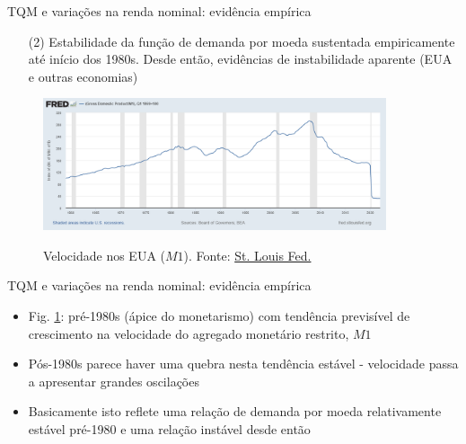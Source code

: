 \documentclass[10pt]{beamer}
\begin{document}
\begin{frame}{TQM e variações na renda nominal: evidência empírica}
    \begin{itemize}
        \item[(2)] Estabilidade da função de demanda por moeda sustentada empiricamente até início dos 1980s. Desde então, evidências de instabilidade aparente (EUA e outras economias)
    \end{itemize}
    \begin{figure}
        \centering
        \href{https://fred.stlouisfed.org/graph/?g=PNOQ}{\includegraphics[width=0.9\textwidth]{./figures/aula10_fig1.png}}
        \caption{Velocidade nos EUA ($M1$). Fonte: \href{https://fred.stlouisfed.org/graph/?g=PNOQ}{St. Louis Fed.}}
        \label{fig1}
    \end{figure}
\end{frame}

\begin{frame}{TQM e variações na renda nominal: evidência empírica}
    \begin{itemize}
        \item Fig. \ref{fig1}: pré-1980s (ápice do monetarismo) com tendência previsível de crescimento na velocidade do agregado monetário restrito, $M1$
        \bigskip
        \item Pós-1980s parece haver uma quebra nesta tendência estável - velocidade passa a apresentar grandes oscilações
        \bigskip
        \item Basicamente isto reflete uma relação de demanda por moeda relativamente estável pré-1980 e uma relação instável desde então
    \end{itemize}
\end{frame}
\end{document}
